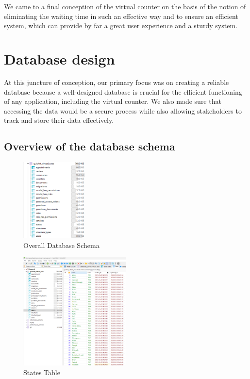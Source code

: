 \medskip We came to a final conception of the virtual counter on the basis of the notion of eliminating the waiting time in such an effective way and to ensure an efficient system, which can provide by far a great user experience and a sturdy system. 
\newpage
\section{Database design}
At this juncture of conception, our primary focus was on creating a reliable database because a well-designed database is crucial for the efficient functioning of any application, including the virtual counter. We also made sure that accessing the data would be a secure process while also allowing stakeholders to track and store their data effectively.

\subsection{Overview of the database schema}
\begin{figure}[H]
    \centering
    \includegraphics*[width=0.3\textwidth]{SCREENSHOTS/overall.png}
    \caption{Overall Database Schema}
    \label{fig:overall-database-schema}
\end{figure}

\begin{figure}[H]
    \centering
    \includegraphics*[width=0.5\textwidth]{SCREENSHOTS/states.png}
    \caption{States Table}
    \label{fig:states-table}
\end{figure}

